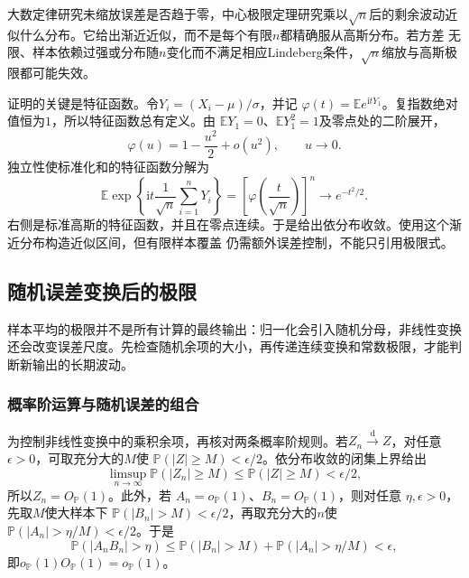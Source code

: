 大数定律研究未缩放误差是否趋于零，中心极限定理研究乘以\(\sqrt{n}\)后的剩余波动近似什么分布。它给出渐近近似，而不是每个有限\(n\)都精确服从高斯分布。若方差
无限、样本依赖过强或分布随\(n\)变化而不满足相应Lindeberg条件，\(\sqrt{n}\)缩放与高斯极限都可能失效。

证明的关键是特征函数。令\(Y_i=(X_i-\mu)/\sigma\)，并记
\(\varphi(t)=\mathbb{E}e^{\mathrm{i}tY_1}\)。复指数绝对值恒为\(1\)，所以特征函数总有定义。由
\(\mathbb{E}Y_1=0\)、\(\mathbb{E}Y_1^2=1\)及零点处的二阶展开，
\[
  \varphi(u)=1-\frac{u^2}{2}+o(u^2),
  \qquad u\to0.
\]
独立性使标准化和的特征函数分解为
\[
  \mathbb{E}\exp\left\{
    \mathrm{i}t\frac{1}{\sqrt n}\sum_{i=1}^{n}Y_i
  \right\}
  =
  \left[\varphi\left(\frac{t}{\sqrt n}\right)\right]^n
  \longrightarrow e^{-t^2/2}.
\]
右侧是标准高斯的特征函数，并且在零点连续。于是给出依分布收敛。使用这个渐近分布构造近似区间，但有限样本覆盖
仍需额外误差控制，不能只引用极限式。
\subsection{随机误差变换后的极限}
\label{sec:stoch-random-transform-limits}
样本平均的极限并不是所有计算的最终输出：归一化会引入随机分母，非线性变换还会改变误差尺度。先检查随机余项的大小，再传递连续变换和常数极限，才能判断新输出的长期波动。

\subsubsection{概率阶运算与随机误差的组合}
为控制非线性变换中的乘积余项，再核对两条概率阶规则。若\(Z_n\xrightarrow{\mathrm d}Z\)，对任意
\(\epsilon>0\)，可取充分大的\(M\)使
\(\mathbb{P}(|Z|\geq M)<\epsilon/2\)。依分布收敛的闭集上界给出
\[
  \limsup_{n\to\infty}\mathbb{P}(|Z_n|\geq M)
  \leq \mathbb{P}(|Z|\geq M)<\epsilon/2,
\]
所以\(Z_n=O_{\mathbb{P}}(1)\)。此外，若
\(A_n=o_{\mathbb{P}}(1)\)、\(B_n=O_{\mathbb{P}}(1)\)，则对任意
\(\eta,\epsilon>0\)，先取\(M\)使大样本下
\(\mathbb{P}(|B_n|>M)<\epsilon/2\)，再取充分大的\(n\)使
\(\mathbb{P}(|A_n|>\eta/M)<\epsilon/2\)。于是
\[
  \mathbb{P}(|A_nB_n|>\eta)
  \leq
  \mathbb{P}(|B_n|>M)
  +\mathbb{P}(|A_n|>\eta/M)
  <\epsilon,
\]
即\(o_{\mathbb{P}}(1)O_{\mathbb{P}}(1)=o_{\mathbb{P}}(1)\)。


